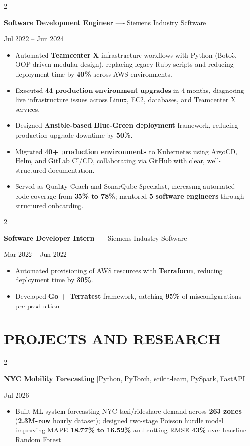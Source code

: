 \documentclass[10pt, letterpaper]{article}
\newenvironment{highlights}{
    \begin{itemize}[
        topsep=0.10 cm,
        parsep=0.06 cm,
        partopsep=0pt,
        itemsep=0.06 cm,
        leftmargin=12pt
    ]
}{
    \end{itemize}
}
\newenvironment{twocolentry}[2][]{
    \onecolentry
    \def\secondColumn{#2}
    \setcolumnwidth{\fill, 4.5 cm}
    \begin{paracol}{2}
}{
    \switchcolumn \raggedleft \secondColumn
    \end{paracol}
    \endonecolentry
}
\begin{document}
\vspace{0.15 cm}

\begin{twocolentry}{Jul 2022 -- Jun 2024}
\textbf{Software Development Engineer} ---- Siemens Industry Software
\end{twocolentry}
\begin{highlights}
  \item Automated \textbf{Teamcenter X} infrastructure workflows with Python (Boto3, OOP-driven modular design), replacing legacy Ruby scripts and reducing deployment time by \textbf{40\%} across AWS environments.
  \item Executed \textbf{44 production environment upgrades} in 4 months, diagnosing live infrastructure issues across Linux, EC2, databases, and Teamcenter X services.
  \item Designed \textbf{Ansible-based Blue-Green deployment} framework, reducing production upgrade downtime by \textbf{50\%}.
  \item Migrated \textbf{40+ production environments} to Kubernetes using ArgoCD, Helm, and GitLab CI/CD, collaborating via GitHub with clear, well-structured documentation.
  \item Served as Quality Coach and SonarQube Specialist, increasing automated code coverage from \textbf{35\% to 78\%}; mentored \textbf{5 software engineers} through structured onboarding.
\end{highlights}

\vspace{0.15 cm}

\begin{twocolentry}{Mar 2022 -- Jun 2022}
\textbf{Software Developer Intern} ---- Siemens Industry Software
\end{twocolentry}
\begin{highlights}
  \item Automated provisioning of AWS resources with \textbf{Terraform}, reducing deployment time by \textbf{30\%}.
  \item Developed \textbf{Go + Terratest} framework, catching \textbf{95\%} of misconfigurations pre-production.
\end{highlights}

\section{PROJECTS AND RESEARCH}
\begin{twocolentry}{Jul 2026}
\textbf{NYC Mobility Forecasting} [Python, PyTorch, scikit-learn, PySpark, FastAPI]
\end{twocolentry}
\begin{highlights}
  \item Built ML system forecasting NYC taxi/rideshare demand across \textbf{263 zones} (\textbf{2.3M-row} hourly dataset); designed two-stage Poisson hurdle model improving MAPE \textbf{18.77\% to 16.52\%} and cutting RMSE \textbf{43\%} over baseline Random Forest.
\end{highlights}
\end{document}
